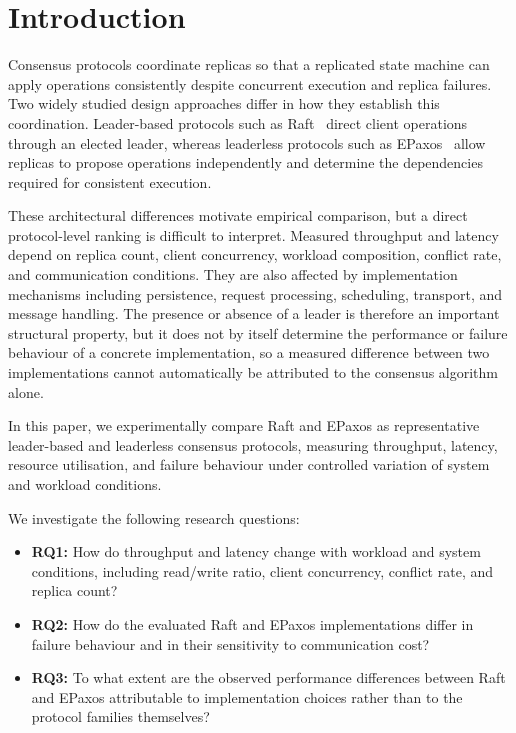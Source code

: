 \section{Introduction}

\label{sec:introduction}

Consensus protocols coordinate replicas so that a replicated state machine
can apply operations consistently despite concurrent execution and replica
failures. Two widely studied design approaches differ in how they establish
this coordination. Leader-based protocols such as Raft~\cite{ongaro2014raft}
direct client operations through an elected leader, whereas leaderless
protocols such as EPaxos~\cite{moraru2013epaxos} allow replicas to propose
operations independently and determine the dependencies required for
consistent execution.

These architectural differences motivate empirical comparison, but a direct
protocol-level ranking is difficult to interpret. Measured throughput and
latency depend on replica count, client concurrency, workload composition,
conflict rate, and communication conditions. They are also affected by
implementation mechanisms including persistence, request processing,
scheduling, transport, and message handling. The presence or absence of a
leader is therefore an important structural property, but it does not by
itself determine the performance or failure behaviour of a concrete
implementation, so a measured difference between two implementations cannot
automatically be attributed to the consensus algorithm alone.

In this paper, we experimentally compare Raft and EPaxos as representative
leader-based and leaderless consensus protocols, measuring throughput,
latency, resource utilisation, and failure behaviour under controlled
variation of system and workload conditions.

We investigate the following research questions:

\begin{itemize}

\item \textbf{RQ1:} How do throughput and latency change with workload and
system conditions, including read/write ratio, client concurrency, conflict
rate, and replica count?

\item \textbf{RQ2:} How do the evaluated Raft and EPaxos implementations
differ in failure behaviour and in their sensitivity to communication cost?

\item \textbf{RQ3:} To what extent are the observed performance differences
between Raft and EPaxos attributable to implementation choices rather than
to the protocol families themselves?

\end{itemize}

